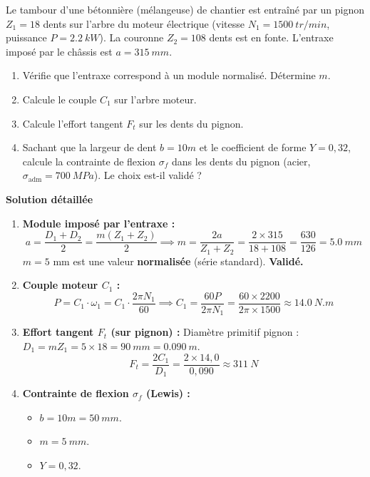 \documentclass[11pt]{article}
\begin{document}
\begin{exoresolu}
    Le tambour d'une bétonnière (mélangeuse) de chantier est entraîné par un pignon $Z_1 = 18$ dents sur l'arbre du moteur électrique (vitesse $N_1 = \SI{1500}{tr/min}$, puissance $P = \SI{2,2}{kW}$). La couronne $Z_2 = 108$ dents est en fonte. L'entraxe imposé par le châssis est $a = \SI{315}{mm}$.
    \begin{enumerate}
        \item Vérifie que l'entraxe correspond à un module normalisé. Détermine $m$.
        \item Calcule le couple $C_1$ sur l'arbre moteur.
        \item Calcule l'effort tangent $F_t$ sur les dents du pignon.
        \item Sachant que la largeur de dent $b = 10m$ et le coefficient de forme $Y = 0,32$, calcule la contrainte de flexion $\sigma_f$ dans les dents du pignon (acier, $\sigma_{\text{adm}} = \SI{700}{MPa}$). Le choix est-il validé ?
    \end{enumerate}
    \tcblower
    \textbf{Solution détaillée}
    \begin{enumerate}
        \item \textbf{Module imposé par l'entraxe :}
              \[
              a = \frac{D_1 + D_2}{2} = \frac{m(Z_1 + Z_2)}{2} \implies m = \frac{2a}{Z_1 + Z_2} = \frac{2 \times 315}{18 + 108} = \frac{630}{126} = \SI{5,0}{mm}
              \]
              $m = 5$ mm est une valeur \textbf{normalisée} (série standard). \textbf{Validé.}
        \item \textbf{Couple moteur $C_1$ :}
              \[
              P = C_1 \cdot \omega_1 = C_1 \cdot \frac{2\pi N_1}{60} \implies C_1 = \frac{60 P}{2\pi N_1} = \frac{60 \times 2200}{2\pi \times 1500} \approx \SI{14,0}{N.m}
              \]
        \item \textbf{Effort tangent $F_t$ (sur pignon) :}
              Diamètre primitif pignon : $D_1 = m Z_1 = 5 \times 18 = \SI{90}{mm} = \SI{0,090}{m}$.
              \[
              F_t = \frac{2 C_1}{D_1} = \frac{2 \times 14,0}{0,090} \approx \SI{311}{N}
              \]
        \item \textbf{Contrainte de flexion $\sigma_f$ (Lewis) :}
              \begin{itemize}
                  \item $b = 10m = \SI{50}{mm}$.
                  \item $m = \SI{5}{mm}$.
                  \item $Y = 0,32$.

\end{itemize}
\end{enumerate}
\end{exoresolu}
\end{document}
